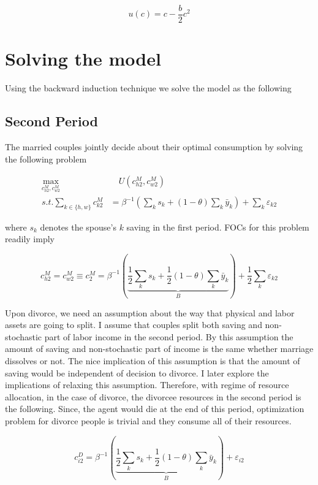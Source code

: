\begin{equation*}
u(c) = c - \dfrac{b}{2} c^2
\end{equation*}

\section{Solving the model}
Using the backward induction technique we solve the model as the following 
\subsection{Second Period}
The married couples jointly decide about their optimal consumption by solving the following problem 

\begin{align}
\max_{c_{h2}^M, c_{w2}^M} & \quad U(c^M_{h2}, c_{w2}^M) \nonumber \\
s.t. \sum_{k \in \{h,w\}} c_{k2}^M & = \beta^{-1} \left (\sum_k s_k + (1-\theta) \sum_k \bar y_k \right ) + \sum_k \varepsilon_{k2} \nonumber
\end{align}

\noindent where $s_k$ denotes the spouse's $k$ saving in the first period. FOCs for this problem readily imply

\begin{equation}
c_{h2}^M = c_{w2}^M \equiv c_{2}^M = \beta^{-1} \left ( \underbrace{\dfrac{1}{2} \sum_k s_k + \dfrac{1}{2} (1-\theta) \sum_k \bar y_k }_{B}\right ) + \dfrac{1}{2}\sum_k \varepsilon_{k2} 
\label{c2m}
\end{equation}

Upon divorce, we need an assumption about the way that physical and labor assets are going to split. I assume that couples split both saving and non-stochastic part of labor income in the second period. By this assumption the amount of saving and non-stochastic part of income is the same whether marriage dissolves or not. The nice implication of this assumption is that the amount of saving would be independent of decision to divorce. I later explore the implications of relaxing this assumption. Therefore, with regime of resource allocation, in the case of divorce, the divorcee resources in the second period is the following. Since, the agent would die at the end of this period, optimization problem for divorce people is trivial and they consume all of their resources. 

\begin{equation}
c_{i2}^D = \beta^{-1} \left ( \underbrace{\dfrac{1}{2} \sum_k s_k + \dfrac{1}{2} (1-\theta) \sum_k \bar y_k}_{B} \right ) + \varepsilon_{i2} 
\label{c2d}
\end{equation}

